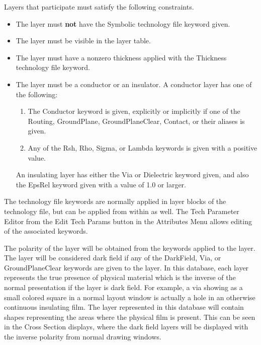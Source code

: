 Layers that participate must satisfy the following constraints.
\begin{itemize}
\item{The layer must {\bf not} have the {\et Symbolic} technology file
keyword given.}

\item{The layer must be visible in the layer table.}

\item{The layer must have a nonzero thickness applied with the
{\et Thickness} technology file keyword.}

\item{The layer must be a conductor or an insulator.  A conductor
layer has one of the following:
\begin{enumerate}
\item{The {\et Conductor} keyword is given, explicitly or implicitly
if one of the {\et Routing}, {\et GroundPlane}, {\et
GroundPlaneClear}, {\et Contact}, or their aliases is given.}

\item{Any of the {\et Rsh}, {\et Rho}, {\et Sigma}, or {\et Lambda}
keywords is given with a positive value.}
\end{enumerate}

An insulating layer has either the {\et Via} or {\et Dielectric}
keyword given, and also the {\et EpsRel} keyword given with a value of
1.0 or larger.}
\end{itemize}

The technology file keywords are normally applied in layer blocks of
the technology file, but can be applied from within {\Xic} as well. 
The {\cb Tech Parameter Editor} from the {\cb Edit Tech Params} button
in the {\cb Attributes Menu} allows editing of the associated
keywords.

The polarity of the layer will be obtained from the keywords applied
to the layer.  The layer will be considered dark field if any of the
{\et DarkField}, {\et Via}, or {\et GroundPlaneClear} keywords are
given to the layer.  In this database, each layer represents the true
presence of physical material which is the inverse of the normal
presentation if the layer is dark field.  For example, a via showing
as a small colored square in a normal layout window is actually a hole
in an otherwise continuous insulating film.  The layer represented in
this database will contain shapes representing the areas where the
physical film is present.  This can be seen in the {\cb Cross Section}
displays, where the dark field layers will be displayed with the
inverse polarity from normal drawing windows.

